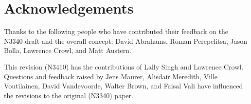 \section{Acknowledgements}

Thanks to the following people who have contributed their feedback on the N3340 draft and the overall concept: David Abrahams, Roman Perepelitsa, Jason Bolla, Lawrence Crowl, and Matt Austern.

This revision (N3410) has the contributions of Lally Singh and Lawrence Crowl. Questions and feedback raised by Jens Maurer, Alisdair Meredith, Ville Voutilainen, David Vandevoorde, Walter Brown, and Faisal Vali have influenced the revisions to the original (N3340) paper.
